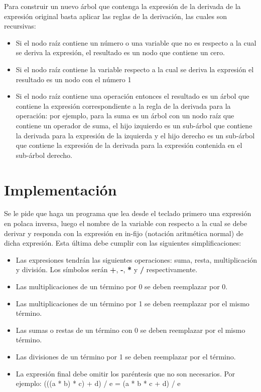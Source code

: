 \documentclass[dcc]{fcfmcourse}
\begin{document}
\newpage
Para construir un nuevo árbol que contenga la expresión de la derivada de la expresión original basta aplicar las reglas de la derivación, las cuales son recursivas:
\begin{itemize}
    \item Si el nodo raíz contiene un número o una variable que no es respecto a la cual se deriva la expresión, el resultado es un nodo que contiene un cero.
    \item Si el nodo raíz contiene la variable respecto a la cual se deriva la expresión el resultado es un nodo con el número 1
    \item Si el nodo raíz contiene una operación entonces el resultado es un árbol que contiene la expresión correspondiente a la regla de la derivada para la operación: por ejemplo, para la suma es un árbol con un nodo raíz que contiene un operador de suma, el hijo izquierdo es un sub-árbol que contiene la derivada para la expresión de la izquierda y el hijo derecho es un sub-árbol que contiene la expresión de la derivada para la expresión contenida en el sub-árbol derecho. 
\end{itemize}

\section{Implementación}
Se le pide que haga un programa que lea desde el teclado primero una expresión en polaca inversa, luego el nombre de la variable con respecto  a la cual se debe derivar y responda con la expresión en in-fijo (notación aritmética normal) de dicha expresión. Esta última debe cumplir con las siguientes simplificaciones: 

\begin{itemize}
    \item Las expresiones tendrán las siguientes operaciones: suma, resta, multiplicación y división. Los símbolos serán \textbf{+}, \textbf{-}, \textbf{*} y \textbf{/} respectivamente.
    \item Las multiplicaciones de un término por 0 se deben reemplazar por 0.
    \item Las multiplicaciones de un término por 1 se deben reemplazar por el mismo término.
    \item Las sumas o restas de un término con 0 se deben reemplazar por el mismo término.
    \item Las divisiones de un término por 1 se deben reemplazar por el término.
    \item La expresión final debe omitir los paréntesis que no son necesarios. 
    \newline Por ejemplo: (((a * b) * c) + d) / e = (a * b * c + d) / e
\end{itemize}
\end{document}
